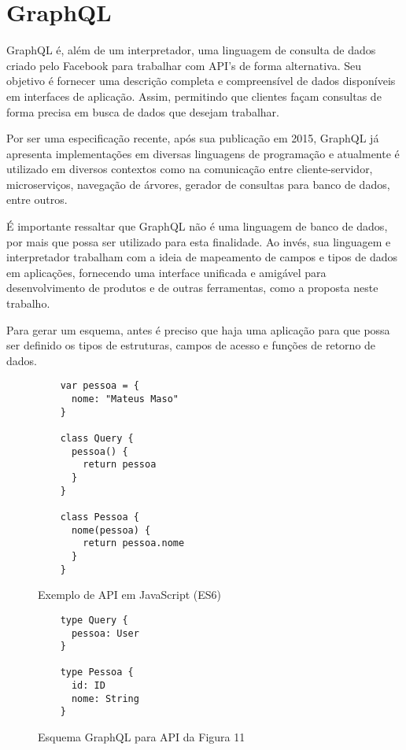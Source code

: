 \chapter{GraphQL}

GraphQL é, além de um interpretador, uma linguagem de consulta de dados criado pelo Facebook para trabalhar com API's de forma alternativa. Seu objetivo é fornecer uma descrição completa e compreensível de dados disponíveis em interfaces de aplicação. Assim, permitindo que clientes façam consultas de forma precisa em busca de dados que desejam trabalhar. \cite{GraphQL2016}

Por ser uma especificação recente, após sua publicação em 2015, GraphQL já apresenta implementações em diversas linguagens de programação e atualmente é utilizado em diversos contextos como na comunicação entre cliente-servidor, microserviços, navegação de árvores, gerador de consultas para banco de dados, entre outros.

É importante ressaltar que GraphQL não é uma linguagem de banco de dados, por mais que possa ser utilizado para esta finalidade. Ao invés, sua linguagem e interpretador trabalham com a ideia de mapeamento de campos e tipos de dados em aplicações, fornecendo uma interface unificada e amigável para desenvolvimento de produtos e de outras ferramentas, como a proposta neste trabalho. \cite{GraphQL2016}

Para gerar um esquema, antes é preciso que haja uma aplicação para que possa ser definido os tipos de estruturas, campos de acesso e funções de retorno de dados.

\begin{figure}[H]
  \centering
  \begin{verbatim}
    var pessoa = {
      nome: "Mateus Maso"
    }

    class Query {
      pessoa() {
        return pessoa
      }
    }

    class Pessoa {
      nome(pessoa) {
        return pessoa.nome
      }
    }
  \end{verbatim}
  \caption{Exemplo de API em JavaScript (ES6)}
\end{figure}

\begin{figure}[H]
  \centering
  \begin{verbatim}
    type Query {
      pessoa: User
    }

    type Pessoa {
      id: ID
      nome: String
    }
  \end{verbatim}
  \caption{Esquema GraphQL para API da Figura 11}
\end{figure}

